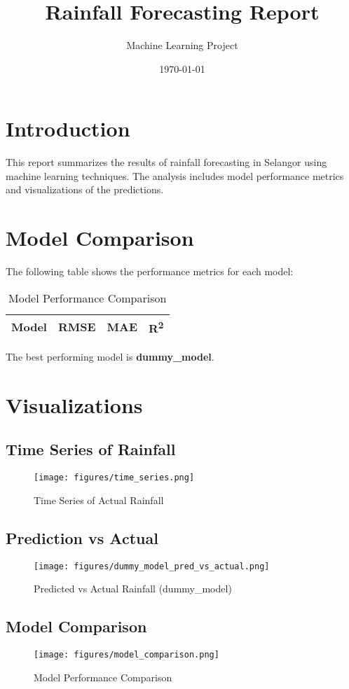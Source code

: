\documentclass{article}
\title{Rainfall Forecasting Report}
\author{Machine Learning Project}
\date{\today}
\begin{document}
\maketitle

\section{Introduction}
This report summarizes the results of rainfall forecasting in Selangor using machine learning techniques. 
The analysis includes model performance metrics and visualizations of the predictions.

\section{Model Comparison}
The following table shows the performance metrics for each model:

\begin{table}[h]
\centering
\caption{Model Performance Comparison}
\begin{tabular}{lccc}
\toprule
Model & RMSE & MAE & R\textsuperscript{2} \\
\midrule

\bottomrule
\end{tabular}
\end{table}

The best performing model is \textbf{dummy\_model}.

\section{Visualizations}
\subsection{Time Series of Rainfall}
\begin{figure}[h]
\centering
\texttt{[image: figures/time\_series.png]}
\caption{Time Series of Actual Rainfall}
\end{figure}

\subsection{Prediction vs Actual}
\begin{figure}[h]
\centering
\texttt{[image: figures/dummy\_model\_pred\_vs\_actual.png]}
\caption{Predicted vs Actual Rainfall (dummy\_model)}
\end{figure}

\subsection{Model Comparison}
\begin{figure}[h]
\centering
\texttt{[image: figures/model\_comparison.png]}
\caption{Model Performance Comparison}
\end{figure}
\end{document}
